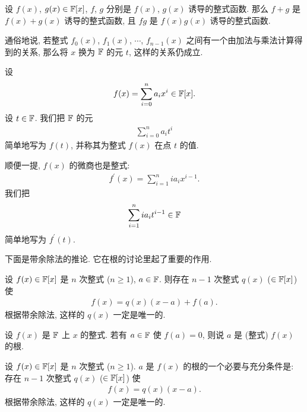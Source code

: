 \begin{proposition}
    设 $f(x)$, $g(x) \in \mathbb{F}[x]$, $f$, $g$ 分别是 $f(x)$, $g(x)$ 诱导的整式函数. 那么 $f+g$ 是 $f(x)+g(x)$ 诱导的整式函数, 且 $fg$ 是 $f(x)g(x)$ 诱导的整式函数.

    通俗地说, 若整式 $f_0 (x)$, $f_1 (x)$, $\cdots$, $f_{n-1} (x)$ 之间有一个由加法与乘法计算得到的关系, 那么将 $x$ 换为 $\mathbb{F}$ 的元 $t$, 这样的关系仍成立.
\end{proposition}

\begin{definition}
    设
    \begin{align*}
        f(x) = \sum_{i=0}^n a_i x^i \in \mathbb{F}[x].
    \end{align*}
    设 $t \in \mathbb{F}$. 我们把 $\mathbb{F}$ 的元
    \begin{align*}
        \sum_{i=0}^n a_i t^i
    \end{align*}
    简单地写为 $f(t)$, 并称其为整式 $f(x)$ 在点 $t$ 的值.

    顺便一提, $f(x)$ 的微商也是整式:
    \begin{align*}
        f^{\prime} (x) = \sum_{i = 1}^{n} i a_i x^{i - 1}.
    \end{align*}
    我们把
    \begin{align*}
        \sum_{i = 1}^{n} i a_i t^{i - 1} \in \mathbb{F}
    \end{align*}
    简单地写为 $f^{\prime} (t)$.
\end{definition}

下面是带余除法的推论. 它在根的讨论里起了重要的作用.

\begin{proposition}
    设 $f(x) \in \mathbb{F}[x]$ 是 $n$ 次整式 ($n \geq 1$), $a \in \mathbb{F}$. 则存在 $n-1$ 次整式 $q(x)$ ($\in \mathbb{F}[x]$) 使
    \begin{align*}
        f(x) = q(x) (x-a) + f(a).
    \end{align*}
    根据带余除法, 这样的 $q(x)$ 一定是唯一的.
\end{proposition}

\begin{definition}
    设 $f(x)$ 是 $\mathbb{F}$ 上 $x$ 的整式. 若有 $a \in \mathbb{F}$ 使 $f(a) = 0$, 则说 $a$ 是 (整式) $f(x)$ 的根.
\end{definition}

\begin{proposition}
    设 $f(x) \in \mathbb{F}[x]$ 是 $n$ 次整式 ($n \geq 1$). $a$ 是 $f(x)$ 的根的一个必要与充分条件是: 存在 $n-1$ 次整式 $q(x)$ ($\in \mathbb{F}[x]$) 使
    \begin{align*}
        f(x) = q(x) (x-a).
    \end{align*}
    根据带余除法, 这样的 $q(x)$ 一定是唯一的.
\end{proposition}

